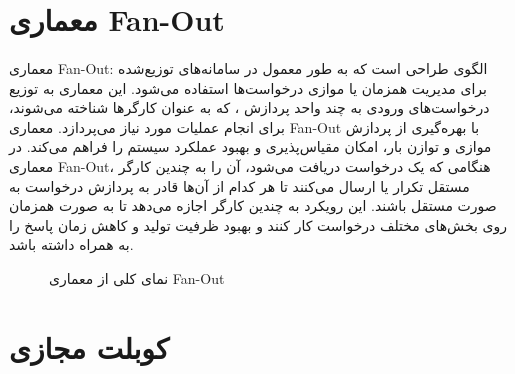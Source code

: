 \section{معماری Fan-Out}
\label{sec:fanout}
\paragraph{}
{
    معماری Fan-Out: الگوی طراحی است که به طور معمول در سامانه‌های توزیع‌شده برای مدیریت همزمان یا موازی درخواست‌ها استفاده می‌شود. این معماری به توزیع درخواست‌های ورودی به چند واحد پردازش ، که به عنوان کارگرها شناخته می‌شوند، برای انجام عملیات مورد نیاز می‌پردازد. معماری Fan-Out با بهره‌گیری از پردازش موازی و توازن بار، امکان مقیاس‌پذیری و بهبود عملکرد سیستم را فراهم می‌کند. در معماری Fan-Out، هنگامی که یک درخواست دریافت می‌شود، آن را به چندین کارگر مستقل تکرار یا ارسال می‌کنند تا هر کدام از آن‌ها قادر به پردازش درخواست به صورت مستقل باشند. این رویکرد به چندین کارگر اجازه می‌دهد تا به صورت همزمان روی بخش‌های مختلف درخواست کار کنند و بهبود ظرفیت تولید و کاهش زمان پاسخ را به همراه داشته باشد.
    \begin{figure}[H]
        \caption{نمای کلی از معماری Fan-Out}
        \label{fig:fanout}
    \end{figure}
}

\section{کوبلت مجازی}
\label{sec:vritkubelet}
